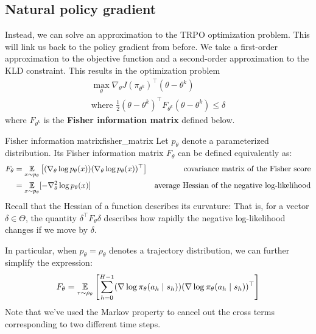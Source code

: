 \documentclass[\main/main]{subfiles}
\begin{document}
\subsection{Natural policy gradient}

Instead, we can solve an approximation to the TRPO optimization problem. This will link us back to the policy gradient from before. We take a first-order approximation to the objective function and a second-order approximation to the KLD constraint.
This results in the optimization problem
\begin{equation}
    \begin{gathered}
        \max_\theta \nabla_\theta J(\pi_{\theta^k})^\top (\theta - \theta^k) \\
        \text{where } \frac{1}{2} (\theta - \theta^k)^\top F_{\theta^k} (\theta - \theta^k) \le \delta
    \end{gathered}
    \label{npg_optimization}
\end{equation}
where $F_{\theta^k}$ is the \textbf{Fisher information matrix} defined below.
\begin{definition}{Fisher information matrix}{fisher_matrix}
    Let $p_\theta$ denote a parameterized distribution. Its Fisher information matrix $F_\theta$ can be defined equivalently as:
    \begin{align*}
        F_{\theta} & = \operatorname*{\mathbb{E}}_{x \sim p_\theta} \left[ (\nabla_\theta \log p_\theta(x)) (\nabla_\theta \log p_\theta(x))^\top \right] & \text{covariance matrix of the Fisher score}          \\
                   & = \operatorname*{\mathbb{E}}_{x \sim p_{\theta}} [- \nabla_\theta^2 \log p_\theta(x)]                                                & \text{average Hessian of the negative log-likelihood}
    \end{align*}
    Recall that the Hessian of a function describes its curvature: That is, for a vector $\delta \in \Theta$, the quantity $\delta^\top F_\theta \delta$ describes how rapidly the negative log-likelihood changes if we move by $\delta$.

    In particular, when $p_\theta = \rho_{\theta}$ denotes a trajectory distribution, we can further simplify the expression:
    \begin{equation}
        F_{\theta} = \operatorname*{\mathbb{E}}_{\tau \sim \rho_\theta} \left[ \sum_{h=0}^{H-1} (\nabla \log \pi_\theta (a_h \mid s_h)) (\nabla \log \pi_\theta(a_h \mid s_h))^\top \right]
        \label{eq:fisher_trajectory}
    \end{equation}
    Note that we've used the Markov property to cancel out the cross terms corresponding to two different time steps.
\end{definition}
\end{document}
